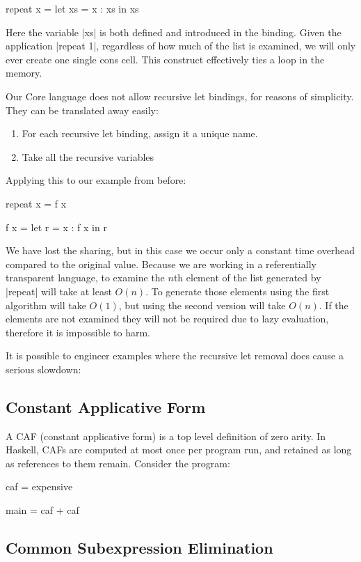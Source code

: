 \begin{code}
repeat x = let xs = x : xs
           in xs
\end{code}

Here the variable |xs| is both defined and introduced in the binding. Given the application |repeat 1|, regardless of how much of the list is examined, we will only ever create one single cons cell. This construct effectively ties a loop in the memory.

Our Core language does not allow recursive let bindings, for reasons of simplicity. They can be translated away easily:

\begin{enumerate}
\item For each recursive let binding, assign it a unique name.
\item Take all the recursive variables
\end{enumerate}

Applying this to our example from before:

\begin{code}
repeat x = f x

f x =  let r = x : f x
       in r
\end{code}

We have lost the sharing, but in this case we occur only a constant time overhead compared to the original value. Because we are working in a referentially transparent language, to examine the $n$th element of the list generated by |repeat| will take at least $O(n)$. To generate those elements using the first algorithm will take $O(1)$, but using the second version will take $O(n)$. If the elements are not examined they will not be required due to lazy evaluation, therefore it is impossible to harm.

It is possible to engineer examples where the recursive let removal does cause a serious slowdown:



\subsection{Constant Applicative Form}


A CAF (constant applicative form) is a top level definition of zero arity. In Haskell, CAFs are computed at most once per program run, and retained as long as references to them remain. Consider the program:

\begin{code}
caf = expensive

main = caf + caf
\end{code}


\subsection{Common Subexpression Elimination}

\cite{chitil:cse}

